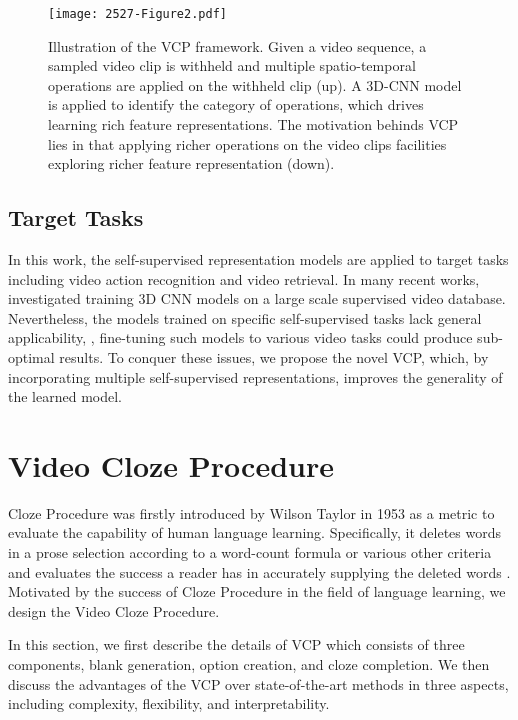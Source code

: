 \documentclass[letterpaper]{article}
\begin{document}
\begin{figure*}[!t]
     \centering
     \texttt{[image: 2527-Figure2.pdf]}
     \caption{Illustration of the VCP framework. Given a video sequence, a sampled video clip is withheld and multiple spatio-temporal operations are applied on the withheld clip (up). A 3D-CNN model is applied to identify the category of operations, which drives learning rich feature representations. The motivation behinds VCP lies in that applying richer operations on the video clips facilities exploring richer feature representation (down). }
     \label{fig:framework}
 \end{figure*}

\subsection{Target Tasks} 
In this work, the self-supervised representation models are applied to target tasks including video action recognition and video retrieval. 
In many recent works, 
~\cite{tran2018closer,tran2015learning} investigated training 3D CNN models on a large scale supervised video database. 
Nevertheless, the models trained on specific self-supervised tasks lack general applicability, , fine-tuning such models to various video tasks could produce sub-optimal results. To conquer these issues, we propose the novel VCP, which, by incorporating multiple self-supervised representations, improves the generality of the learned model.


\section{Video Cloze Procedure}
Cloze Procedure was firstly introduced by Wilson Taylor in 1953 as a metric to evaluate the capability of human language learning. Specifically, it deletes words in a prose selection according to a word-count formula or various other criteria and evaluates the success a reader has in accurately supplying the deleted words \cite{bickley1970cloze}. Motivated by the success of Cloze Procedure in the field of language learning, we design the Video Cloze Procedure.

In this section, we first describe the details of VCP which consists of three components,  blank generation, option creation, and cloze completion. We then discuss the advantages of the VCP over state-of-the-art methods in three aspects, including complexity, flexibility, and interpretability. 
\end{document}
